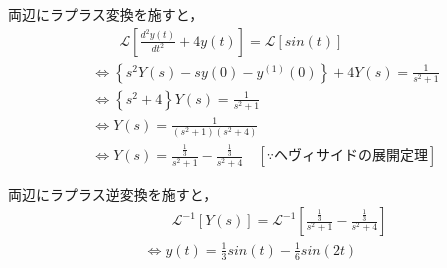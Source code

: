 \documentclass[a4paper,12pt]{article}
\begin{document}
\begin{tcolorbox}[title={[16] つぎの微分方程式をラプラス変換を用いて解け．\\
\[
\frac{d^2y(t)}{dt^2} + 4 y(t) = sin(t)
\]

\quad ただし，初期条件は，\(y(0)=0, y^{(1)}(0)=0\) とする． }]


    \quad 両辺にラプラス変換を施すと，
    \vspace{-3mm}
    \begin{align*}
        &\qquad \mathcal{L}\left[ \frac{d^2y(t)}{dt^2} + 4 y(t) \right] 
        = \mathcal{L} \left[ sin(t) \right] \\
        &\Leftrightarrow \left\{ s^2 Y(s) - sy(0) - y^{(1)}(0) \right\}
        + 4 Y(s) = \frac{1}{s^2 + 1}  \\
        &\Leftrightarrow \left\{ s^2 + 4 \right\} Y(s) = \frac{1}{s^2 + 1}  \\
        &\Leftrightarrow Y(s) = \frac{1}{(s^2+1)(s^2+4)}  \\
        &\Leftrightarrow Y(s) = \frac{ \frac{1}{3} }{s^2+1} - \frac{ \frac{1}{3} }{s^2+4} 
        \quad \left[\because ヘヴィサイドの展開定理 \right]
    \end{align*}
        
    \quad 両辺にラプラス逆変換を施すと，
    \vspace{-3mm}
    \begin{align*}
    &\qquad \mathcal{L}^{-1} \left[ Y(s) \right] 
    = \mathcal{L}^{-1} \left[  \frac{ \frac{1}{3} }{s^2+1} - \frac{ \frac{1}{3} }{s^2+4}   \right] \\
    &\Leftrightarrow y(t) = \frac{1}{3}sin(t) - \frac{1}{6}sin(2t)
    \end{align*}
\end{tcolorbox}
\end{document}
